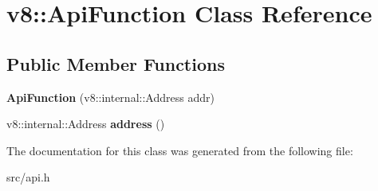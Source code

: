 \hypertarget{classv8_1_1_api_function}{}\section{v8\+:\+:Api\+Function Class Reference}
\label{classv8_1_1_api_function}
\subsection*{Public Member Functions}
\begin{DoxyCompactItemize}
\item 
\hypertarget{classv8_1_1_api_function_a711c062e7328b2cd864a755290ccc70c}{}{\bfseries Api\+Function} (v8\+::internal\+::\+Address addr)\label{classv8_1_1_api_function_a711c062e7328b2cd864a755290ccc70c}

\item 
\hypertarget{classv8_1_1_api_function_ae3168a2d34c3c799c4aae32a9c3bdba2}{}v8\+::internal\+::\+Address {\bfseries address} ()\label{classv8_1_1_api_function_ae3168a2d34c3c799c4aae32a9c3bdba2}

\end{DoxyCompactItemize}


The documentation for this class was generated from the following file\+:\begin{DoxyCompactItemize}
\item 
src/api.\+h\end{DoxyCompactItemize}
